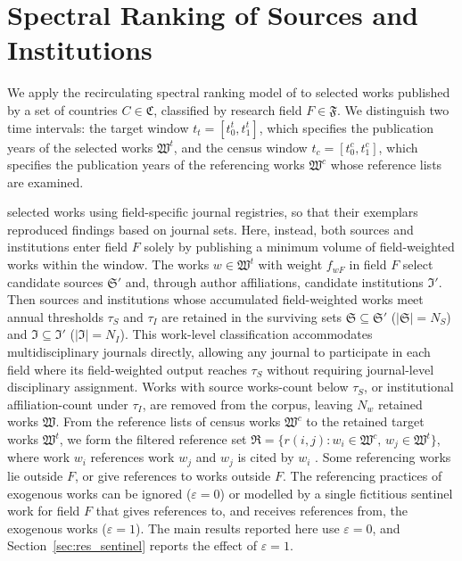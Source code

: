 \section{Spectral Ranking of Sources and Institutions}
\label{sec:spectral_ranking}

We apply the recirculating spectral ranking model of \citet{docampodomingoRecirculatingCardinalSpectral2026} to selected works published by a set of countries $C \in \mathfrak{C}$, classified by research field $F \in \mathfrak{F}$. We distinguish two time intervals: the target window $t_t = [t_0^t, t_1^t]$, which specifies the publication years of the selected works $\mathfrak{W}^t$, and the census window $t_c = [t_0^c, t_1^c]$, which specifies the publication years of the referencing works $\mathfrak{W}^c$ whose reference lists are examined. 

\citet{docampodomingoRecirculatingCardinalSpectral2026} selected works using field-specific journal registries, so that their exemplars reproduced findings based on journal sets. Here, instead, both sources and institutions enter field $F$ solely by publishing a minimum volume of field-weighted works within the window. The works $w \in \mathfrak{W}^t$ with weight $f_{wF}$ in field $F$ select candidate sources $\mathfrak{S}'$ and, through author affiliations, candidate institutions $\mathfrak{I}'$. Then sources and institutions whose accumulated field-weighted works meet annual thresholds $\tau_S$ and $\tau_I$ are retained in the surviving sets $\mathfrak{S} \subseteq \mathfrak{S}'$ ($|\mathfrak{S}| = N_S$) and $\mathfrak{I} \subseteq \mathfrak{I}'$ ($|\mathfrak{I}| = N_I$). This work-level classification accommodates multidisciplinary journals directly, allowing any journal to participate in each field where its field-weighted output reaches $\tau_S$ without requiring journal-level disciplinary assignment. Works with source works-count below $\tau_S$, or institutional affiliation-count under $\tau_I$, are removed from the corpus, leaving $N_w$ retained works $\mathfrak{W}$. From the reference lists of census works $\mathfrak{W}^c$ to the retained target works $\mathfrak{W}^t$, we form the filtered reference set $\mathfrak{R} = \{r(i, j) : w_i \in \mathfrak{W}^c,\, w_j \in \mathfrak{W}^t\}$, where work $w_i$ references work $w_j$ and $w_j$ is cited by $w_i$ \citep{woutersCitationCulture1999}. Some referencing works lie outside $F$, or give references to works outside $F$. The referencing practices of exogenous works can be ignored ($\varepsilon = 0$) or modelled by a single fictitious sentinel work for field $F$ that gives references to, and receives references from, the exogenous works ($\varepsilon = 1$). The main results reported here use $\varepsilon = 0$, and Section~\ref{sec:res_sentinel} reports the effect of $\varepsilon = 1$.

